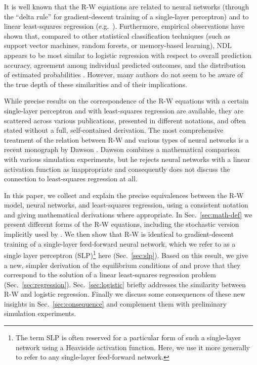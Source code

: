 \documentclass[conference]{IEEEtran}
\begin{document}
It is well known that the R-W equations are related to neural networks (through the ``delta rule'' for gradient-descent training of a single-layer perceptron) and to linear least-squares regression (e.g.\ \cite{gluckbower1988,danks2003,baayenetal2011}). Furthermore, empirical observations have shown that, compared to other statistical classification techniques (such as support vector machines, random forests, or memory-based learning), NDL appears to be most similar to logistic regression with respect to overall prediction accuracy, agreement among individual predicted outcomes, and the distribution of estimated probabilities \cite{arppebaayen2011}. However, many authors do not seem to be aware of the true depth of these similarities and of their implications.

While precise results on the correspondence of the \mbox{R-W} equations with a certain single-layer perceptron \cite[p.\ 155f]{suttonbarto1981} and with least-squares regression \cite[p.\ 457]{stone1986} are available, they are scattered across various publications, presented in different notations, and often stated without a full, self-contained derivation.  The most comprehensive treatment of the relation between R-W and various types of neural networks is a recent monograph by Dawson \cite{dawson2008}.  Dawson combines a mathematical comparison with various simulation experiments, but he rejects neural networks with a linear activation function as inappropriate \cite[p.\ 11]{dawson2008} and consequently does not discuss the connection to least-squares regression at all.  

In this paper, we collect and explain the precise equivalences between the R-W model, neural networks, and least-squares regression, using a consistent notation and giving mathematical derivations where appropriate.  In Sec.~\ref{sec:math-def} we present different forms of the R-W equations, including the stochastic version implicitly used by \cite{danks2003}. We then show that R-W is identical to gradient-descent training of a single-layer feed-forward neural network, which we refer to as a single layer perceptron (SLP)\footnote{The term SLP is often reserved for a particular form of such a single-layer network using a Heaviside activation function.  Here, we use it more generally to refer to any single-layer feed-forward network.} here (Sec.~\ref{sec:slp}). Based on this result, we give a new, simpler derivation of the equilibrium conditions of \cite{danks2003} and prove that they correspond to the solution of a linear least-squares regression problem (Sec.~\ref{sec:regression}). Sec.~\ref{sec:logistic} briefly addresses the similarity between R-W and logistic regression.  Finally we discuss some consequences of these new insights in Sec.~\ref{sec:consequence} and complement them with preliminary simulation experiments.
\end{document}
